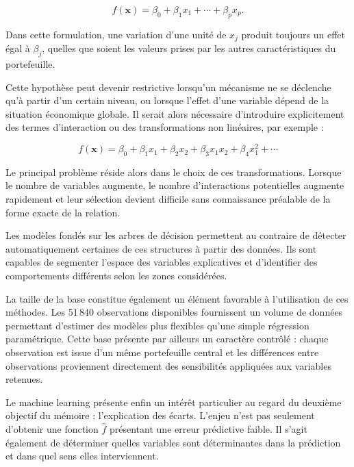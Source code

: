 \begin{equation}
    f(\mathbf{x})
    =
    \beta_0
    +
    \beta_1 x_1
    +
    \cdots
    +
    \beta_p x_p.
\end{equation}

Dans cette formulation, une variation d'une unité de $x_j$ produit toujours un effet égal à $\beta_j$, quelles que soient les valeurs prises par les autres caractéristiques du portefeuille.

Cette hypothèse peut devenir restrictive lorsqu'un mécanisme ne se déclenche qu'à partir d'un certain niveau, ou lorsque l'effet d'une variable dépend de la situation économique globale. Il serait alors nécessaire d'introduire explicitement des termes d'interaction ou des transformations non linéaires, par exemple :

\begin{equation}
    f(\mathbf{x})
    =
    \beta_0
    +
    \beta_1 x_1
    +
    \beta_2 x_2
    +
    \beta_3 x_1 x_2
    +
    \beta_4 x_1^2
    + \cdots
\end{equation}

Le principal problème réside alors dans le choix de ces transformations. Lorsque le nombre de variables augmente, le nombre d'interactions potentielles augmente rapidement et leur sélection devient difficile sans connaissance préalable de la forme exacte de la relation.

Les modèles fondés sur les arbres de décision permettent au contraire de détecter automatiquement certaines de ces structures à partir des données. Ils sont capables de segmenter l'espace des variables explicatives et d'identifier des comportements différents selon les zones considérées.

La taille de la base constitue également un élément favorable à l'utilisation de ces méthodes. Les 51\,840 observations disponibles fournissent un volume de données permettant d'estimer des modèles plus flexibles qu'une simple régression paramétrique. Cette base présente par ailleurs un caractère contrôlé : chaque observation est issue d'un même portefeuille central et les différences entre observations proviennent directement des sensibilités appliquées aux variables retenues.

Le machine learning présente enfin un intérêt particulier au regard du deuxième objectif du mémoire : l'explication des écarts. L'enjeu n'est pas seulement d'obtenir une fonction $\widehat{f}$ présentant une erreur prédictive faible. Il s'agit également de déterminer quelles variables sont déterminantes dans la prédiction et dans quel sens elles interviennent.


